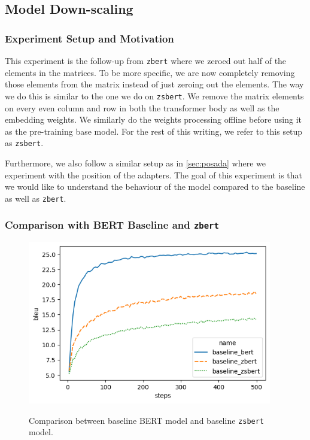 \subsection{Model Down-scaling}
\subsubsection{Experiment Setup and Motivation}
This experiment is the follow-up from \texttt{zbert} where we zeroed out half of the elements in the matrices. To be more specific, we are now completely removing those elements from the matrix instead of just zeroing out the elements. The way we do this is similar to the one we do on \texttt{zsbert}. We remove the matrix elements on every even column and row in both the transformer body as well as the embedding weights. We similarly do the weights processing offline before using it as the pre-training base model. For the rest of this writing, we refer to this setup as \texttt{zsbert}.

Furthermore, we also follow a similar setup as in \cref{sec:posada} where we experiment with the position of the adapters. The goal of this experiment is that we would like to understand the behaviour of the model compared to the baseline as well as \texttt{zbert}.

\subsubsection{Comparison with BERT Baseline and \texttt{zbert}}

\begin{figure}[h]
    {\includegraphics[width=0.95\textwidth]{img/baseline_zsbert.png}}
    \centering
    \caption{Comparison between baseline BERT model and baseline \texttt{zsbert} model.}
    \label{img:baseline_zsbert}
\end{figure}

